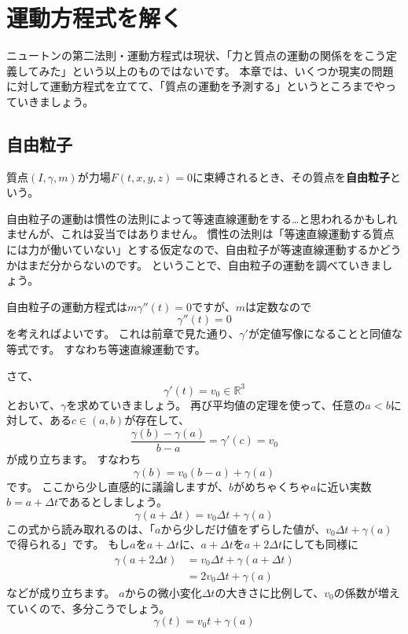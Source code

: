 \chapter{運動方程式を解く}

ニュートンの第二法則・運動方程式は現状、「力と質点の運動の関係ををこう定義してみた」という以上のものではないです。
本章では、いくつか現実の問題に対して運動方程式を立てて、「質点の運動を予測する」というところまでやっていきましょう。



\section{自由粒子}

\begin{definition}[自由粒子]
  質点$(I,\gamma,m)$が力場$F(t,x,y,z)=0$に束縛されるとき、その質点を\textbf{自由粒子}という。
\end{definition}

自由粒子の運動は慣性の法則によって等速直線運動をする…と思われるかもしれませんが、これは妥当ではありません。
慣性の法則は「等速直線運動する質点には力が働いていない」とする仮定なので、自由粒子が等速直線運動するかどうかはまだ分からないのです。
ということで、自由粒子の運動を調べていきましょう。

自由粒子の運動方程式は$m\gamma''(t)=0$ですが、$m$は定数なので
\[
  \gamma''(t)=0
\]
を考えればよいです。
これは前章で見た通り、$\gamma'$が定値写像になることと同値な等式です。
すなわち等速直線運動です。

さて、
\[
  \gamma'(t)=v_0\in\mathbb{R}^3
\]
とおいて、$\gamma$を求めていきましょう。
再び平均値の定理を使って、任意の$a<b$に対して、ある$c\in(a,b)$が存在して、
\[
  \frac{\gamma(b)-\gamma(a)}{b-a}=\gamma'(c)=v_0
\]
が成り立ちます。
すなわち
\[
  \gamma(b)=v_0(b-a)+\gamma(a)
\]
です。
ここから少し直感的に議論しますが、$b$がめちゃくちゃ$a$に近い実数$b=a+\Delta t$であるとしましょう。
\[
  \gamma(a+\Delta t)=v_0\Delta t+\gamma(a)
\]
この式から読み取れるのは、「$a$から少しだけ値をずらした値が、$v_0\Delta t+\gamma(a)$で得られる」です。
もし$a$を$a+\Delta t$に、$a+\Delta t$を$a+2\Delta t$にしても同様に
\begin{align*}
  \gamma(a+2\Delta t)&=v_0\Delta t+\gamma(a+\Delta t)\\
  &=2v_0\Delta t+\gamma(a)
\end{align*}
などが成り立ちます。
$a$からの微小変化$\Delta t$の大きさに比例して、$v_0$の係数が増えていくので、多分こうでしょう。
\[
  \gamma(t)=v_0t+\gamma(a)
\]

